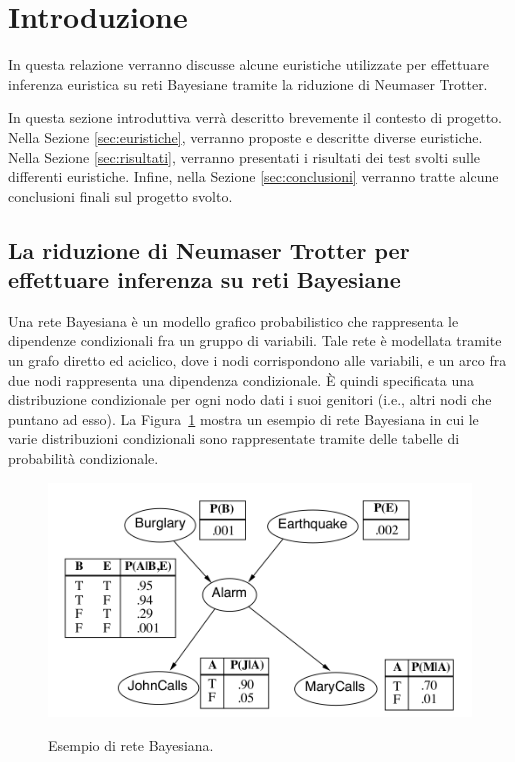 \section{Introduzione}
\label{sec:introduzione}


In questa relazione verranno discusse alcune euristiche utilizzate per effettuare inferenza euristica su reti Bayesiane tramite la riduzione di Neumaser Trotter. 

In questa sezione introduttiva verrà descritto brevemente il contesto di progetto. Nella Sezione \ref{sec:euristiche}, verranno proposte e descritte diverse euristiche. Nella Sezione \ref{sec:risultati}, verranno presentati i risultati dei test svolti sulle differenti euristiche. Infine, nella Sezione \ref{sec:conclusioni} verranno tratte alcune conclusioni finali sul progetto svolto.

\subsection{La riduzione di Neumaser Trotter per effettuare inferenza su reti Bayesiane}

Una rete Bayesiana è un modello grafico probabilistico che rappresenta le dipendenze condizionali fra un gruppo di variabili. Tale rete è modellata tramite un grafo diretto ed aciclico, dove i nodi corrispondono alle variabili, e un arco fra due nodi rappresenta una dipendenza condizionale. È quindi specificata una distribuzione condizionale per ogni nodo dati i suoi genitori (i.e., altri nodi che puntano ad esso). La Figura~\ref{fig:reteB} mostra un esempio di rete Bayesiana in cui le varie distribuzioni condizionali sono rappresentate tramite delle tabelle di probabilità condizionale.

\begin{figure}[htbp]
\includegraphics[width=\textwidth]{res/img/reteBayesiana.png}
\label{fig:reteB}
\caption{Esempio di rete Bayesiana.}
\end{figure}

